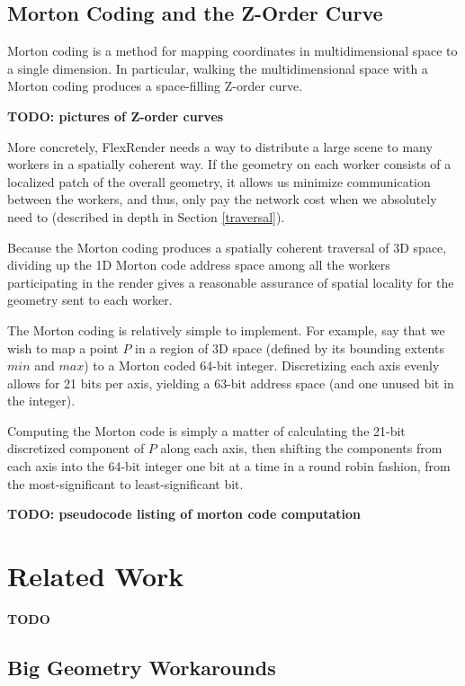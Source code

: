 \documentclass[12pt]{ucthesis}
\begin{document}
\section{Morton Coding and the Z-Order Curve}
\label{morton}

Morton coding is a method for mapping coordinates in multidimensional space to
a single dimension. In particular, walking the multidimensional space with a
Morton coding produces a space-filling Z-order curve.

\textbf{TODO: pictures of Z-order curves}

More concretely, FlexRender needs a way to distribute a large scene to many
workers in a spatially coherent way. If the geometry on each worker consists
of a localized patch of the overall geometry, it allows us minimize communication
between the workers, and thus, only pay the network cost when we absolutely need
to (described in depth in Section \ref{traversal}).

Because the Morton coding produces a spatially coherent traversal of 3D space,
dividing up the 1D Morton code address space among all the workers participating
in the render gives a reasonable assurance of spatial locality for the geometry
sent to each worker.

The Morton coding is relatively simple to implement. For example, say that
we wish to map a point $P$ in a region of 3D space (defined by its bounding extents
$min$ and $max$) to a Morton coded 64-bit integer. Discretizing each axis evenly
allows for 21 bits per axis, yielding a 63-bit address space (and one unused bit
in the integer).

Computing the Morton code is simply a matter of calculating the 21-bit discretized
component of $P$ along each axis, then shifting the components from each axis
into the 64-bit integer one bit at a time in a round robin fashion, from the
most-significant to least-significant bit.

\textbf{TODO: pseudocode listing of morton code computation}

\chapter{Related Work}
\label{relatedwork}

\textbf{TODO}

\section{Big Geometry Workarounds}
\label{managingcomplexity}
\end{document}
